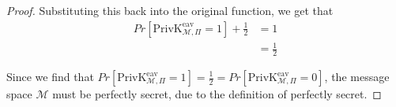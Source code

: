 \documentclass{article}
\begin{document}
\begin{enumerate}
\begin{enumerate}
\begin{proof}
          Substituting this back into the original function, we get that
          \begin{align*}
            Pr[\text{PrivK}_{\mathcal{M}, \Pi}^{\text{eav}} = 1] 
            + \frac{1}{2} &= 1\\
                          &= \frac{1}{2}
          \end{align*}

          Since we find that $Pr[\text{PrivK}_{\mathcal{M}, \Pi}^{\text{eav}} =
          1] = \frac{1}{2} = Pr[\text{PrivK}_{\mathcal{M}, \Pi}^{\text{eav}} =
          0]$, the message space $\mathcal{M}$ must be perfectly secret, due to
          the definition of perfectly secret.
        \end{proof}
    \end{enumerate}
\end{enumerate}
\end{document}
